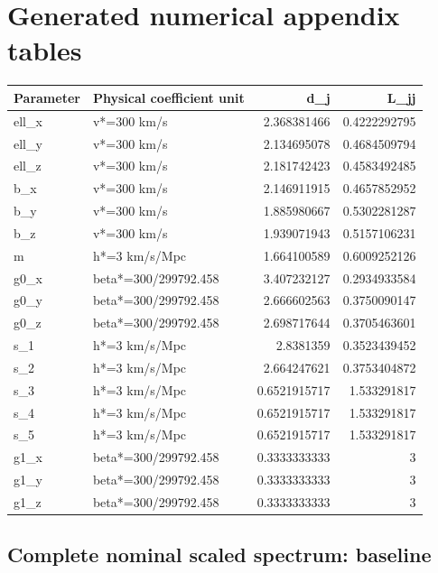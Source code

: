 \hypertarget{generated-numerical-appendix-tables}{%
\section{Generated numerical appendix tables}\label{generated-numerical-appendix-tables}}

\begin{longtable}[]{@{}llrr@{}}
\toprule\noalign{}
Parameter & Physical coefficient unit & d\_j & L\_jj \\
\midrule\noalign{}
\endhead
\bottomrule\noalign{}
\endlastfoot
ell\_x & v*=300 km/s & 2.368381466 & 0.4222292795 \\
ell\_y & v*=300 km/s & 2.134695078 & 0.4684509794 \\
ell\_z & v*=300 km/s & 2.181742423 & 0.4583492485 \\
b\_x & v*=300 km/s & 2.146911915 & 0.4657852952 \\
b\_y & v*=300 km/s & 1.885980667 & 0.5302281287 \\
b\_z & v*=300 km/s & 1.939071943 & 0.5157106231 \\
m & h*=3 km/s/Mpc & 1.664100589 & 0.6009252126 \\
g0\_x & beta*=300/299792.458 & 3.407232127 & 0.2934933584 \\
g0\_y & beta*=300/299792.458 & 2.666602563 & 0.3750090147 \\
g0\_z & beta*=300/299792.458 & 2.698717644 & 0.3705463601 \\
s\_1 & h*=3 km/s/Mpc & 2.8381359 & 0.3523439452 \\
s\_2 & h*=3 km/s/Mpc & 2.664247621 & 0.3753404872 \\
s\_3 & h*=3 km/s/Mpc & 0.6521915717 & 1.533291817 \\
s\_4 & h*=3 km/s/Mpc & 0.6521915717 & 1.533291817 \\
s\_5 & h*=3 km/s/Mpc & 0.6521915717 & 1.533291817 \\
g1\_x & beta*=300/299792.458 & 0.3333333333 & 3 \\
g1\_y & beta*=300/299792.458 & 0.3333333333 & 3 \\
g1\_z & beta*=300/299792.458 & 0.3333333333 & 3 \\
\end{longtable}

\hypertarget{complete-nominal-scaled-spectrum-baseline}{%
\subsection{Complete nominal scaled spectrum: baseline}\label{complete-nominal-scaled-spectrum-baseline}}

